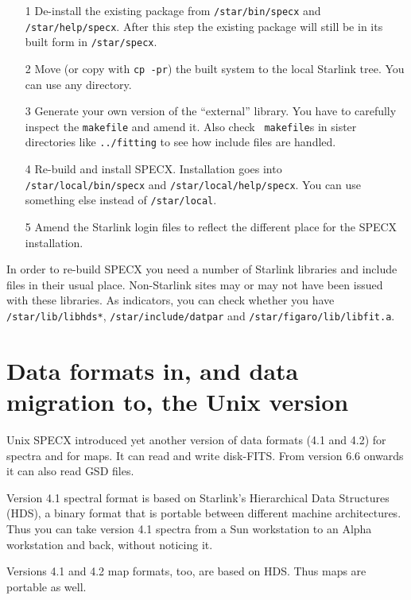 \documentclass[twoside,11pt]{article}
\renewcommand{\_}{\texttt{\symbol{95}}}
\begin{document}
\begin{itemize}
\item[1] De-install the existing package from {\tt /star/bin/specx} and
   {\tt /star/help/specx}. After this step the existing package will
   still be in its built form in {\tt /star/specx}.
\item[2] Move (or copy with {\tt cp -pr}) the built system to the local
   Starlink tree. You can use any directory.
\item[3] Generate your own version of the ``external'' library. You have
   to carefully inspect the {\tt makefile} and amend it. Also check {\tt
   makefile}s in sister directories like {\tt ../fitting} to see how
   include files are handled.
\item[4] Re-build and install SPECX. Installation goes into {\tt
   /star/local/bin/specx} and {\tt /star/\-local/help/specx}. You can use
   something else instead of {\tt /star/local}.
\item[5] Amend the Starlink login files to reflect the different place
   for the SPECX installation.
\end{itemize}

In order to re-build SPECX you need a number of Starlink libraries and
include files in their usual place. Non-Starlink sites may or may not
have been issued with these libraries. As indicators, you can check
whether you have {\tt /star/lib/libhds*}, {\tt /star/include/dat\_par}
and {\tt /star/figaro/lib/libfit.a}.


\section{Data formats in, and data migration to, the Unix version}

Unix SPECX introduced yet another version of data formats (4.1 and 4.2) for
spectra and for maps. It can read and write disk-FITS. From version 6.6
onwards it can also read GSD files.

Version 4.1 spectral format is based on Starlink's Hierarchical Data
Structures (HDS), a binary format that is portable between different
machine architectures. Thus you can take version 4.1 spectra from a Sun
workstation to an Alpha workstation and back, without noticing it.

Versions 4.1 and 4.2 map formats, too, are based on HDS. Thus maps are
portable as well.
\end{document}
